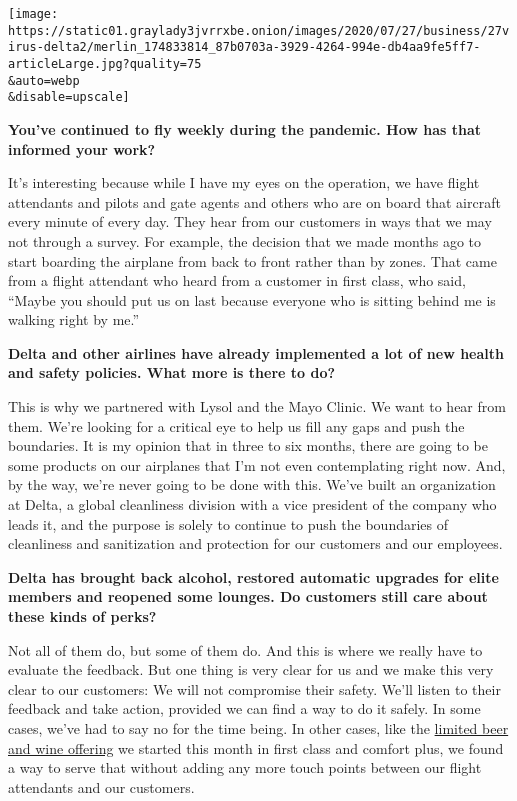 \texttt{[image: https://static01.graylady3jvrrxbe.onion/images/2020/07/27/business/27virus-delta2/merlin\_174833814\_87b0703a-3929-4264-994e-db4aa9fe5ff7-articleLarge.jpg?quality=75\\\&auto=webp\\\&disable=upscale]}

\textbf{You've continued to fly weekly during the pandemic. How has that
informed your work?}

It's interesting because while I have my eyes on the operation, we have
flight attendants and pilots and gate agents and others who are on board
that aircraft every minute of every day. They hear from our customers in
ways that we may not through a survey. For example, the decision that we
made months ago to start boarding the airplane from back to front rather
than by zones. That came from a flight attendant who heard from a
customer in first class, who said, ``Maybe you should put us on last
because everyone who is sitting behind me is walking right by me.''

\textbf{Delta and other airlines have already implemented a lot of new
health and safety policies. What more is there to do?}

This is why we partnered with Lysol and the Mayo Clinic. We want to hear
from them. We're looking for a critical eye to help us fill any gaps and
push the boundaries. It is my opinion that in three to six months, there
are going to be some products on our airplanes that I'm not even
contemplating right now. And, by the way, we're never going to be done
with this. We've built an organization at Delta, a global cleanliness
division with a vice president of the company who leads it, and the
purpose is solely to continue to push the boundaries of cleanliness and
sanitization and protection for our customers and our employees.

\textbf{Delta has brought back alcohol, restored automatic upgrades for
elite members and reopened some lounges. Do customers still care about
these kinds of perks?}

Not all of them do, but some of them do. And this is where we really
have to evaluate the feedback. But one thing is very clear for us and we
make this very clear to our customers: We will not compromise their
safety. We'll listen to their feedback and take action, provided we can
find a way to do it safely. In some cases, we've had to say no for the
time being. In other cases, like the
\href{https://news.delta.com/beverage-service-returns-delta-reintroduces-select-beer-and-wine-domestic-flights-added-safety}{limited
beer and wine offering} we started this month in first class and comfort
plus, we found a way to serve that without adding any more touch points
between our flight attendants and our customers.

